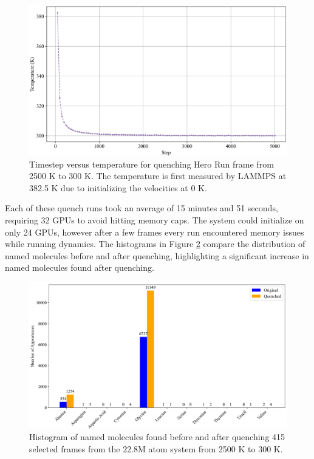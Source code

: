 \begin{figure}[!ht]
    \centering
    \includegraphics[width=1\linewidth]{Images/early_earth/steps_vs_temp_quench.png}
    \caption[MD steps required to quench system]{Timestep versus temperature for quenching Hero Run frame from 2500 K to 300 K. The temperature is first measured by LAMMPS at 382.5 K due to initializing the velocities at 0 K.}
    \label{fig:quench_steps}
\end{figure}

Each of these quench runs took an average of 15 minutes and 51 seconds, requiring 32 GPUs to avoid hitting memory caps.
The system could initialize on only 24 GPUs, however after a few frames every run encountered memory issues while running dynamics.
The histograms in Figure \ref{fig:ee_quench_hist} compare the distribution of named molecules before and after quenching, highlighting a significant increase in named molecules found after quenching.

\begin{figure}[!h]
    \centering
    \includegraphics[width=1\linewidth]{Images/early_earth/mol_before-after_quench.png}
    \caption[Histogram: molecules found before and after quenching system]{Histogram of named molecules found before and after quenching 415 selected frames from the 22.8M atom system from 2500 K to 300 K.}
    \label{fig:ee_quench_hist}
\end{figure}

